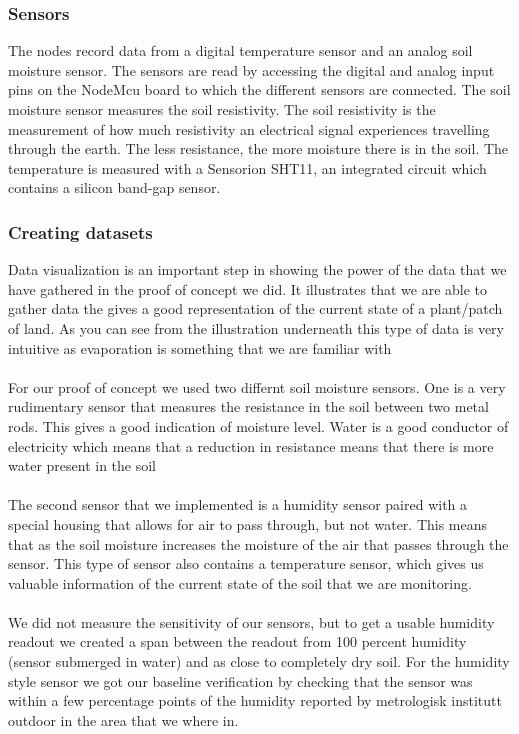 \documentclass[]{uiophd}
\begin{document}
\subsubsection{Sensors}
The nodes record data from a digital temperature sensor and an analog soil moisture sensor. The sensors are read by accessing the digital and analog input pins on the NodeMcu board to which the different sensors are connected. The soil moisture sensor measures the soil resistivity. The soil resistivity is the measurement of how much resistivity an electrical signal experiences travelling through the earth. The less resistance, the more moisture there is in the soil. The temperature is measured with a Sensorion SHT11, an integrated circuit which contains a silicon band-gap sensor.


\subsubsection{Creating datasets}
Data visualization is an important step in showing the power of the data that we have gathered in the proof of concept we did. It illustrates that we are able to gather data the gives a good representation of the current state of a plant/patch of land. As you can see from the illustration underneath this type of data is very intuitive as evaporation is something that we are familiar with
\\\\
For our proof of concept we used two differnt soil moisture sensors. One is a very rudimentary sensor that measures the resistance in the soil between two metal rods. This gives a good indication of moisture level. Water is a good conductor of electricity which means that a reduction in resistance means that there is more water present in the soil
\\\\
The second sensor that we implemented is a humidity sensor paired with a special housing that allows for air to pass through, but not water. This means that as the soil moisture increases the moisture of the air that passes through the sensor. This type of sensor also contains a temperature sensor, which gives us valuable information of the current state of the soil that we are monitoring.
\\\\
We did not measure the sensitivity of our sensors, but to get a usable humidity readout we created a span between the readout from 100 percent humidity (sensor submerged in water) and as close to completely dry soil. For the humidity style sensor we got our baseline verification by checking that the sensor was within a few percentage points of the humidity reported by metrologisk institutt outdoor in the area that we where in.
\end{document}
